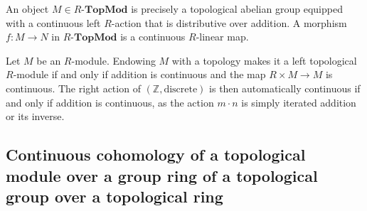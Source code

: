 



\begin{proposition}
An object $M \in R\text{-}\mathbf{TopMod}$ is precisely a topological abelian group equipped with a continuous left $R$-action that is distributive over addition. A morphism $f: M \to N$ in $R\text{-}\mathbf{TopMod}$ is a continuous $R$-linear map.
\end{proposition}


\begin{proposition}
Let $M$ be an $R$-module. Endowing $M$ with a topology makes it a left topological $R$-module if and only if addition is continuous and the map $R \times M \to M$ is continuous. The right action of $(\mathbb{Z}, \text{discrete})$ is then automatically continuous if and only if addition is continuous, as the action $m \cdot n$ is simply iterated addition or its inverse.
\end{proposition}








\subsection{Continuous cohomology of a topological module over a group ring of a topological group over a topological ring}








